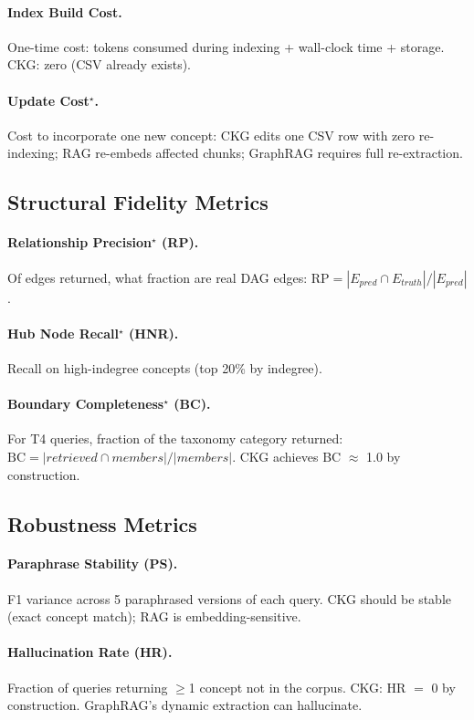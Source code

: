 \paragraph{Index Build Cost.}
One-time cost: tokens consumed during indexing + wall-clock time + storage.
CKG: zero (CSV already exists).

\paragraph{Update Cost$^\star$.}
Cost to incorporate one new concept: CKG edits one CSV row with zero
re-indexing; RAG re-embeds affected chunks; GraphRAG requires full
re-extraction.

\subsection{Structural Fidelity Metrics}\label{sec:metrics-structural}

\paragraph{Relationship Precision$^\star$ (RP).}
Of edges returned, what fraction are real DAG edges:
$\text{RP} = |E_{pred} \cap E_{truth}| / |E_{pred}|$.

\paragraph{Hub Node Recall$^\star$ (HNR).}
Recall on high-indegree concepts (top 20\% by indegree).

\paragraph{Boundary Completeness$^\star$ (BC).}
For T4 queries, fraction of the taxonomy category returned:
$\text{BC} = |retrieved \cap members| / |members|$.
CKG achieves BC $\approx$ 1.0 by construction.

\subsection{Robustness Metrics}\label{sec:metrics-robustness}

\paragraph{Paraphrase Stability (PS).}
F1 variance across 5 paraphrased versions of each query.
CKG should be stable (exact concept match); RAG is embedding-sensitive.

\paragraph{Hallucination Rate (HR).}
Fraction of queries returning $\geq$1 concept not in the corpus.
CKG: HR $=$ 0 by construction. GraphRAG's dynamic extraction can hallucinate.
